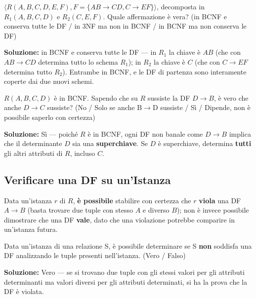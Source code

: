 \documentclass[12pt, a4paper]{article}
\begin{document}
\begin{tcolorbox}[colback=lightergray!10, colframe=tocsec, title=\textbf{Esercizio 3}]
$\langle R(A,B,C,D,E,F), F=\{AB\to CD, C\to EF\}\rangle$, decomposta in $R_1(A,B,C,D)$ e $R_2(C,E,F)$. Quale affermazione è vera? (in BCNF e conserva tutte le DF / in 3NF ma non in BCNF / in BCNF ma non conserva le DF)
\end{tcolorbox}
\textbf{Soluzione:} in BCNF e conserva tutte le DF — in $R_1$ la chiave è $AB$ (che con $AB\to CD$ determina tutto lo schema $R_1$); in $R_2$ la chiave è $C$ (che con $C\to EF$ determina tutto $R_2$). Entrambe in BCNF, e le DF di partenza sono interamente coperte dai due nuovi schemi.

\begin{tcolorbox}[colback=lightergray!10, colframe=tocsec, title=\textbf{Esercizio 4}]
$R(A,B,C,D)$ è in BCNF. Sapendo che su $R$ sussiste la DF $D \to B$, è vero che anche $D \to C$ sussiste? (No / Solo se anche B$\to$D sussiste / Sì / Dipende, non è possibile saperlo con certezza)
\end{tcolorbox}
\textbf{Soluzione:} Sì — poiché $R$ è in BCNF, ogni DF non banale come $D\to B$ implica che il determinante $D$ sia una \textbf{superchiave}. Se $D$ è superchiave, determina \textbf{tutti} gli altri attributi di $R$, incluso $C$.

\subsection{Verificare una DF su un'Istanza}
Data un'istanza $r$ di $R$, \textbf{è possibile} stabilire con certezza che $r$ \textbf{viola} una DF $A\to B$ (basta trovare due tuple con stesso $A$ e diverso $B$); non è invece possibile dimostrare che una DF \textbf{vale}, dato che una violazione potrebbe comparire in un'istanza futura.

\begin{tcolorbox}[colback=lightergray!10, colframe=tocsec, title=\textbf{Esercizio 5}]
Data un'istanza di una relazione S, è possibile determinare se S \textbf{non} soddisfa una DF analizzando le tuple presenti nell'istanza. (Vero / Falso)
\end{tcolorbox}
\textbf{Soluzione:} Vero — se si trovano due tuple con gli stessi valori per gli attributi determinanti ma valori diversi per gli attributi determinati, si ha la prova che la DF è violata.
\end{document}
